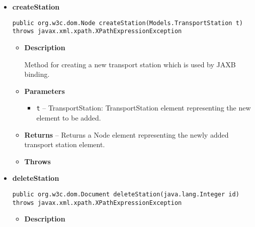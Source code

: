 \documentclass[11pt,a4paper]{report}
\begin{document}
{{{{{{{\begin{itemize}
{\begin{itemize}
{\begin{itemize}
  \end{itemize}
}%
\end{itemize}
}%
\item{ 
\hypertarget{core.StationsInteractor.createStation(Models.TransportStation)}{{\bf  createStation}\\}
\begin{lstlisting}[frame=none]
public org.w3c.dom.Node createStation(Models.TransportStation t) throws javax.xml.xpath.XPathExpressionException\end{lstlisting} %
\begin{itemize}
\item{
{\bf  Description}

Method for creating a new transport station which is used by JAXB binding.
}
\item{
{\bf  Parameters}
  \begin{itemize}
   \item{
\texttt{t} -- TransportStation: TransportStation element representing the new element to be added.}
  \end{itemize}
}%
\item{{\bf  Returns} -- 
Returns a Node element representing the newly added transport station element. 
}%
\item{{\bf  Throws}
}%
\end{itemize}
}%
\item{ 
\hypertarget{core.StationsInteractor.deleteStation(java.lang.Integer)}{{\bf  deleteStation}\\}
\begin{lstlisting}[frame=none]
public org.w3c.dom.Document deleteStation(java.lang.Integer id) throws javax.xml.xpath.XPathExpressionException\end{lstlisting} %
\begin{itemize}
\item{
{\bf  Description}

}
\end{itemize}}
\end{itemize}}}}}}}}
\end{document}
